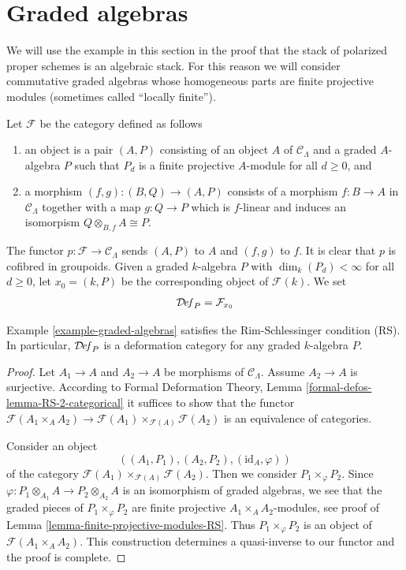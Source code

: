 \section{Graded algebras}
\label{section-graded-algebras}

\noindent
We will use the example in this section in the proof that the stack of
polarized proper schemes is an algebraic stack. For this reason we will
consider commutative graded algebras whose homogeneous parts are
finite projective modules (sometimes called ``locally finite'').

\begin{example}
\label{example-graded-algebras}
Let $\mathcal{F}$ be the category defined as follows
\begin{enumerate}
\item an object is a pair $(A, P)$ consisting of an
object $A$ of $\mathcal{C}_\Lambda$ and a graded $A$-algebra $P$
such that $P_d$ is a finite projective $A$-module for all $d \geq 0$, and
\item a morphism $(f, g) : (B, Q) \to (A, P)$ consists of
a morphism $f : B \to A$ in $\mathcal{C}_\Lambda$ together
with a map $g : Q \to P$ which is $f$-linear and induces an
isomorpism $Q \otimes_{B, f} A \cong P$.
\end{enumerate}
The functor $p : \mathcal{F} \to \mathcal{C}_\Lambda$ sends $(A, P)$
to $A$ and $(f, g)$ to $f$. It is clear that $p$ is cofibred in groupoids.
Given a graded $k$-algebra $P$ with $\dim_k(P_d) < \infty$ for all
$d \geq 0$, let $x_0 = (k, P)$ be the corresponding object of $\mathcal{F}(k)$.
We set
$$
\mathcal{D}\!\mathit{ef}_P = \mathcal{F}_{x_0}
$$
\end{example}

\begin{lemma}
\label{lemma-graded-algebras-RS}
Example \ref{example-graded-algebras}
satisfies the Rim-Schlessinger condition (RS).
In particular, $\mathcal{D}\!\mathit{ef}_P$ is a deformation category
for any graded $k$-algebra $P$.
\end{lemma}

\begin{proof}
Let $A_1 \to A$ and $A_2 \to A$ be morphisms of $\mathcal{C}_\Lambda$.
Assume $A_2 \to A$ is surjective. According to
Formal Deformation Theory, Lemma
\ref{formal-defos-lemma-RS-2-categorical}
it suffices to show that the functor
$\mathcal{F}(A_1 \times_A A_2) \to
\mathcal{F}(A_1) \times_{\mathcal{F}(A)} \mathcal{F}(A_2)$
is an equivalence of categories.

\medskip\noindent
Consider an object
$$
((A_1, P_1), (A_2, P_2), (\text{id}_A, \varphi))
$$
of the category $\mathcal{F}(A_1) \times_{\mathcal{F}(A)} \mathcal{F}(A_2)$.
Then we consider $P_1 \times_\varphi P_2$. Since
$\varphi : P_1 \otimes_{A_1} A \to P_2 \otimes_{A_2} A$
is an isomorphism of graded algebras, we see that the graded pieces
of $P_1 \times_\varphi P_2$ are finite projective $A_1 \times_A A_2$-modules,
see proof of Lemma \ref{lemma-finite-projective-modules-RS}.
Thus $P_1 \times_\varphi P_2$ is an object of $\mathcal{F}(A_1 \times_A A_2)$.
This construction determines a quasi-inverse to our functor
and the proof is complete.
\end{proof}

